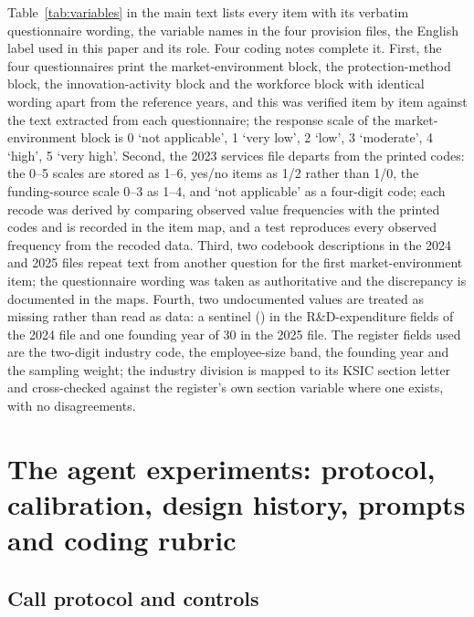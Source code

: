 \documentclass[preprint,12pt,authoryear]{elsarticle}
\begin{document}
Table~\ref{tab:variables} in the main text lists every item with its verbatim questionnaire wording, the variable names in the four provision files, the English label used in this paper and its role. Four coding notes complete it. First, the four questionnaires print the market-environment block, the protection-method block, the innovation-activity block and the workforce block with identical wording apart from the reference years, and this was verified item by item against the text extracted from each questionnaire; the response scale of the market-environment block is 0 `not applicable', 1 `very low', 2 `low', 3 `moderate', 4 `high', 5 `very high'. Second, the 2023 services file departs from the printed codes: the 0--5 scales are stored as 1--6, yes/no items as 1/2 rather than 1/0, the funding-source scale 0--3 as 1--4, and `not applicable' as a four-digit code; each recode was derived by comparing observed value frequencies with the printed codes and is recorded in the item map, and a test reproduces every observed frequency from the recoded data. Third, two codebook descriptions in the 2024 and 2025 files repeat text from another question for the first market-environment item; the questionnaire wording was taken as authoritative and the discrepancy is documented in the maps. Fourth, two undocumented values are treated as missing rather than read as data: a sentinel (\SentinelValueRDExp) in the R\&D-expenditure fields of the 2024 file and one founding year of 30 in the 2025 file. The register fields used are the two-digit industry code, the employee-size band, the founding year and the sampling weight; the industry division is mapped to its KSIC section letter and cross-checked against the register's own section variable where one exists, with no disagreements.

\section{The agent experiments: protocol, calibration, design history, prompts and coding rubric}
\label{app:prompts}

\subsection{Call protocol and controls}
\label{app:protocol}
\end{document}
